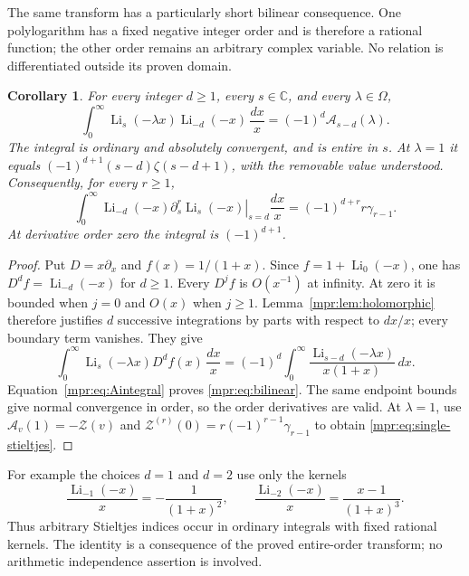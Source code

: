 \documentclass[11pt,letterpaper]{article}
\numberwithin{equation}{section}
\newtheorem{corollary}[theorem]{Corollary}
\theoremstyle{definition}
\theoremstyle{remark}
\begin{document}
The same transform has a particularly short bilinear consequence.
One polylogarithm has a fixed negative integer order and is therefore
a rational function; the other order remains an arbitrary complex
variable.  No relation is differentiated outside its proven domain.

\begin{corollary}\label{mpr:cor:bilinear}
For every integer $d\ge1$, every $s\in\mathbb C$, and every
$\lambda\in\Omega$,
\begin{equation}\label{mpr:eq:bilinear}
 \boxed{\displaystyle
 \int_0^\infty\operatorname{Li}_s(-\lambda x)
                    \operatorname{Li}_{-d}(-x)\,\frac{dx}{x}
   =(-1)^d\mathcal A_{s-d}(\lambda).}
\end{equation}
The integral is ordinary and absolutely convergent, and is entire in
$s$.  At $\lambda=1$ it equals
$(-1)^{d+1}(s-d)\zeta(s-d+1)$, with the removable value understood.
Consequently, for every $r\ge1$,
\begin{equation}\label{mpr:eq:single-stieltjes}
 \boxed{\displaystyle
 \int_0^\infty\operatorname{Li}_{-d}(-x)
       \left.\partial_s^r\operatorname{Li}_s(-x)\right|_{s=d}
                 \frac{dx}{x}
        =(-1)^{d+r}r\gamma_{r-1}.}
\end{equation}
At derivative order zero the integral is $(-1)^{d+1}$.
\end{corollary}

\begin{proof}
Put $D=x\partial_x$ and $f(x)=1/(1+x)$.  Since
$f=1+\operatorname{Li}_0(-x)$, one has
$D^df=\operatorname{Li}_{-d}(-x)$ for $d\ge1$.
Every $D^jf$ is $O(x^{-1})$ at infinity.  At zero it is bounded
when $j=0$ and $O(x)$ when $j\ge1$.
Lemma~\ref{mpr:lem:holomorphic} therefore justifies $d$ successive
integrations by parts with respect to $dx/x$; every boundary term
vanishes.  They give
\[
 \int_0^\infty\operatorname{Li}_s(-\lambda x)D^df(x)\,\frac{dx}{x}
  =(-1)^d\int_0^\infty
       \frac{\operatorname{Li}_{s-d}(-\lambda x)}{x(1+x)}\,dx.
\]
Equation~\eqref{mpr:eq:Aintegral} proves \eqref{mpr:eq:bilinear}.
The same endpoint bounds give normal convergence in order, so the
order derivatives are valid.  At $\lambda=1$, use
$\mathcal A_v(1)=-\mathscr Z(v)$ and
$\mathscr Z^{(r)}(0)=r(-1)^{r-1}\gamma_{r-1}$ to obtain
\eqref{mpr:eq:single-stieltjes}.
\end{proof}

For example the choices $d=1$ and $d=2$ use only the kernels
\[
 \frac{\operatorname{Li}_{-1}(-x)}x=-\frac1{(1+x)^2},\qquad
 \frac{\operatorname{Li}_{-2}(-x)}x=\frac{x-1}{(1+x)^3}.
\]
Thus arbitrary Stieltjes indices occur in ordinary integrals with
fixed rational kernels.  The identity is a consequence of the
proved entire-order transform; no arithmetic independence assertion
is involved.
\end{document}
